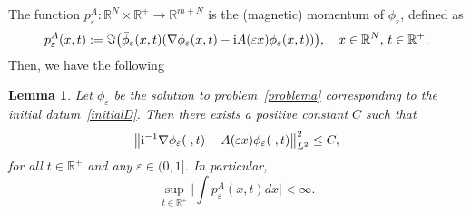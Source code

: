 \documentclass[11pt]{amsart}
\numberwithin{equation}{section}
\newtheorem{lemma}[theorem]{Lemma}
\theoremstyle{definition}
\begin{document}
\noindent
The function $p^A_{\varepsilon}:{{\mathbb R}}^N\times{{\mathbb R}}^+\to{{\mathbb R}}^{m+N}$ is the
(magnetic) momentum of $\phi_{\varepsilon}$, defined as
\begin{equation}
    \label{paepsilon}
p^A_{\varepsilon}(x,t):={{\Im}}\big(\bar\phi_{\varepsilon}(x,t)(
\nabla\phi_{\varepsilon}(x,t)-{{\rm i}} A({\varepsilon} x)\phi_{\varepsilon}(x,t))\big),\quad
x\in{{\mathbb R}}^N,\, t\in{{\mathbb R}}^+.
\end{equation}
Then, we have the following

\begin{lemma}
    \label{normBB}
Let $\phi_{\varepsilon}$ be the solution to problem~\eqref{problema}
corresponding to the initial datum~\eqref{initialD}. Then there
exists a positive constant $C$ such that
$$
\big\|{{\rm i}}^{-1}\nabla\phi_{\varepsilon}(\cdot,t)-A({\varepsilon}
x)\phi_{\varepsilon}(\cdot,t)\big\|^{2}_{L^2}\leq C,
$$
for all $t\in{{\mathbb R}}^+$ and any ${\varepsilon}\in (0,1]$. In particular,
$$
\sup\limits_{t\in{{\mathbb R}}^+}\big|\int
p^A_{\varepsilon}(x,t)dx\big|<\infty.
$$
\end{lemma}
\end{document}
